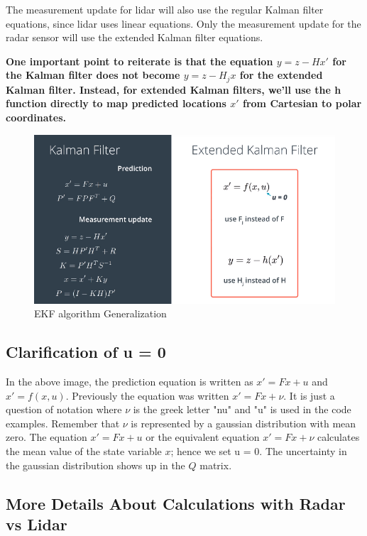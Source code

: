 \documentclass[11pt, a4paper]{article}
\begin{document}
The measurement update for lidar will also use the regular Kalman filter equations, since lidar uses linear equations. Only the measurement update for the radar sensor will use the extended Kalman filter equations.



\textbf{One important point to reiterate is that the equation $y = z - Hx'$ for the Kalman filter does not become $y = z - H_j x$ for the extended Kalman filter. Instead, for extended Kalman filters, we'll use the h function directly to map predicted locations $x'$ from Cartesian to polar coordinates.}



\begin{figure}[htpb!]
	\centering
	\includegraphics[width=0.8\linewidth]{EKF_alforithm_generalization}
	\caption{EKF algorithm Generalization}
	\label{fig:EKF_alforithm_generalization}
\end{figure}


\subsection{Clarification of u = 0}%
\label{sub:clarification_of_u_0_}



In the above image, the prediction equation is written as $x' = Fx + u$ and $x' = f(x,u)$. Previously the equation was written $x' = Fx + \nu$.  It is just a question of notation where $\nu$ is the greek letter "nu" and "u" is used in the code examples. Remember that $\nu$ is represented by a gaussian distribution with mean zero. The equation $x' = Fx + u$ or the equivalent equation $x' = Fx + \nu$ calculates the mean value of the state variable $x$; hence we set u = 0. The uncertainty in the gaussian distribution shows up in the $Q$ matrix.




\subsection{More Details About Calculations with Radar vs Lidar}%
\label{sub:more_details_about_calculations_with_radar_vs_lidar}
\end{document}
